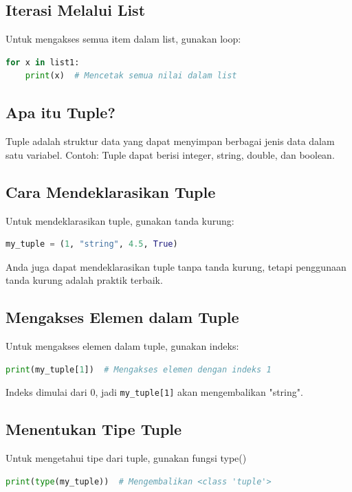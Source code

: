 \documentclass{article}
\begin{document}
\subsection{Iterasi Melalui List}
Untuk mengakses semua item dalam list, gunakan loop:
\begin{lstlisting}[language=Python, caption={}, captionpos=b]
for x in list1:
    print(x)  # Mencetak semua nilai dalam list
\end{lstlisting}

\subsection{Apa itu Tuple?}
Tuple adalah struktur data yang dapat menyimpan berbagai jenis data dalam satu variabel. Contoh: Tuple dapat berisi integer, string, double, dan boolean.

\subsection{Cara Mendeklarasikan Tuple}
Untuk mendeklarasikan tuple, gunakan tanda kurung:
\begin{lstlisting}[language=Python, caption={}, captionpos=b]
my_tuple = (1, "string", 4.5, True)
\end{lstlisting}

Anda juga dapat mendeklarasikan tuple tanpa tanda kurung, tetapi penggunaan tanda kurung adalah praktik terbaik.

\subsection{Mengakses Elemen dalam Tuple}
Untuk mengakses elemen dalam tuple, gunakan indeks:
\begin{lstlisting}[language=Python, caption={}, captionpos=b]
print(my_tuple[1])  # Mengakses elemen dengan indeks 1
\end{lstlisting}

Indeks dimulai dari 0, jadi \verb|my_tuple[1]| akan mengembalikan "string".

\subsection{Menentukan Tipe Tuple}
Untuk mengetahui tipe dari tuple, gunakan fungsi type()
\begin{lstlisting}[language=Python, caption={}, captionpos=b]
print(type(my_tuple))  # Mengembalikan <class 'tuple'>
\end{lstlisting}
\end{document}
